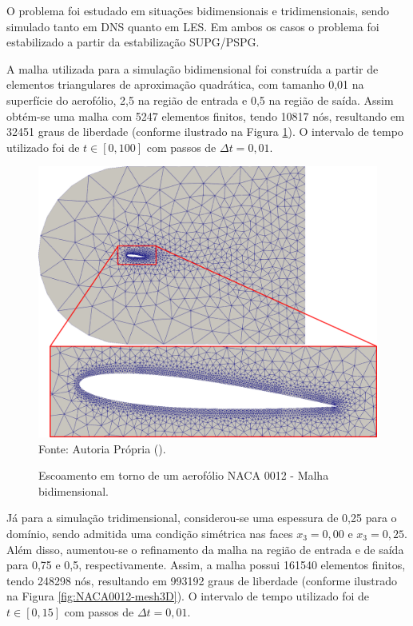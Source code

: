 O problema foi estudado em situações bidimensionais e tridimensionais, sendo simulado tanto em DNS quanto em LES. Em ambos os casos o problema foi estabilizado a partir da estabilização SUPG/PSPG.

A malha utilizada para a simulação bidimensional foi construída a partir de elementos triangulares de aproximação quadrática, com tamanho 0,01 na superfície do aerofólio, 2,5 na região de entrada e 0,5 na região de saída. Assim obtém-se uma malha com 5247 elementos finitos, tendo 10817 nós, resultando em 32451 graus de liberdade (conforme ilustrado na Figura \ref{fig:NACA0012-mesh2D}). O intervalo de tempo utilizado foi de $t\in[0,100]$ com passos de $\Delta t=0,01$.

\begin{figure}[h!]
    \centering
    \caption{Escoamento em torno de um aerofólio NACA 0012 - Malha bidimensional.}
    \includegraphics[width=.7\linewidth]{Figuras/NACA0012/mesh2D.png}
    \\Fonte: Autoria Própria (\the\year).
    \label{fig:NACA0012-mesh2D}
\end{figure}

Já para a simulação tridimensional, considerou-se uma espessura de 0,25 para o domínio, sendo admitida uma condição simétrica nas faces $x_3=0,00$ e $x_3=0,25$. Além disso, aumentou-se o refinamento da malha na região de entrada e de saída para 0,75 e 0,5, respectivamente. Assim, a malha possui 161540 elementos finitos, tendo 248298 nós, resultando em 993192 graus de liberdade (conforme ilustrado na Figura \ref{fig:NACA0012-mesh3D}). O intervalo de tempo utilizado foi de $t\in[0,15]$ com passos de $\Delta t=0,01$.

